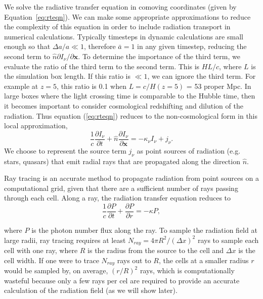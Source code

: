 We solve the radiative transfer equation in comoving coordinates (given by Equation~\ref{eq:rteqn}).
We can make some appropriate approximations to reduce the complexity
of this equation in order to include radiation transport
in numerical calculations.  Typically timesteps in dynamic
calculations are small enough so that $\Delta a/a \ll 1$, therefore
$\bar{a} = 1$ in any given timestep, reducing the second term to
$\hat{n} \partial I_\nu/\partial \mathbf{x}$.  To determine the
importance of the third term, we evaluate the ratio of the third term
to the second term.  This is $HL/c$, where $L$ is the simulation box
length.  If this ratio is $\ll 1$, we can ignore the third term.  For
example at $z=5$, this ratio is 0.1 when $L = c/H(z=5)$ = 53 proper
Mpc.  In large boxes where the light crossing time is comparable to
the Hubble time, then it becomes important to consider cosmological
redshifting and dilution of the radiation.  Thus equation
(\ref{eq:rteqn}) reduces to the non-cosmological form in this local
approximation,
%
\begin{equation}
  \frac{1}{c} \frac{\partial I_\nu}{\partial t} + 
  \hat{n} \frac{\partial I_\nu}{\partial \mathbf{x}} =
  -\kappa_\nu I_\nu + j_\nu .
\end{equation}
%
We choose to represent the source term $j_\nu$ as point sources of
radiation (e.g. stars, quasars) that emit radial rays that are
propagated along the direction $\hat{n}$.

Ray tracing is an accurate method to propagate radiation from point
sources on a computational grid, given that there are a sufficient
number of rays passing through each cell.  Along a ray, the radiation
transfer equation reduces to
%
\begin{equation}
\label{eqn:rtray}
\frac{1}{c} \frac{\partial P}{\partial t} + \frac{\partial P}{\partial
  r} = -\kappa P,
\end{equation}

where $P$ is the photon number flux along the ray.  To sample the
radiation field at large radii, ray tracing requires at least $N_{ray}
= 4\pi R^2 / (\Delta x)^2$ rays to sample each cell with one ray,
where $R$ is the radius from the source to the cell and $\Delta x$ is
the cell width.  If one were to trace $N_{ray}$ rays out to $R$, the
cells at a smaller radius $r$ would be sampled by, on average,
$(r/R)^2$ rays, which is computationally wasteful because only a few
rays per cel  are required to provide an accurate calculation
of the radiation field (as we will show later).

